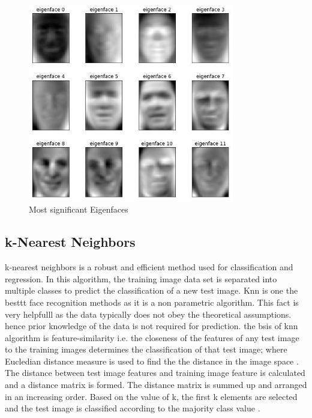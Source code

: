 \documentclass[conference]{IEEEtran}
\begin{document}
\begin{figure}[h!]
 \centering
 \includegraphics[width = 9cm]{eigenface.JPG}
 \caption{ Most significant Eigenfaces}
 \label{fig 1: eigenface}
\end{figure}
	

\subsection{k-Nearest Neighbors } 
\label{subsec: 1b.Knn}
k-nearest neighbors is a robust and efficient method used for classification and regression. In this algorithm, the training image data set is separated into multiple classes to predict the classification of a new test image. Knn is one the besttt face recognition methods as it is a non parametric algorithm. This fact is very helpfulll as the data typically does not obey the theoretical assumptions. hence prior knowledge of the data is not required for prediction. the bsis of knn algorithm is feature-similarity  i.e. the closeness of the features of any test image to the training images determines the classification of that test image; where Eucledian distance measure is used to find the the distance in the image space \cite{wang2005euclidean}. The distance between test image features and training image feature is calculated and a distance matrix is formed. The distance matrix is summed up and arranged in an increasing order. Based on the value of k, the first k elements are selected and the test image is classified according to the majority class value \cite{zhang2007ml}.
\end{document}
